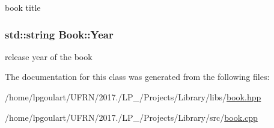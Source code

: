 book title 

\subsubsection[{\texorpdfstring{Year}{Year}}]{\setlength{\rightskip}{0pt plus 5cm}std\+::string Book\+::\+Year\hspace{0.3cm}{\ttfamily [private]}}\hypertarget{classBook_ad3fc2c944e788d179c4d836f36662ae2}{}\label{classBook_ad3fc2c944e788d179c4d836f36662ae2}


release year of the book 



The documentation for this class was generated from the following files\+:\begin{DoxyCompactItemize}
\item 
/home/lpgoulart/\+U\+F\+R\+N/2017./\+L\+P\+\_/\+Projects/\+Library/libs/\hyperlink{book_8hpp}{book.\+hpp}\item 
/home/lpgoulart/\+U\+F\+R\+N/2017./\+L\+P\+\_/\+Projects/\+Library/src/\hyperlink{book_8cpp}{book.\+cpp}\end{DoxyCompactItemize}
